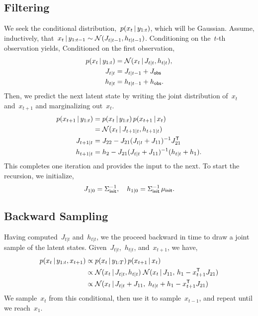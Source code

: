 \documentclass{article}
\begin{document}
\subsection*{Filtering}
We seek the conditional distribution,~$p(x_t \,|\, y_{1:t})$, which
will be Gaussian.  Assume, inductively,
that~$x_t \,|\, y_{1:t-1} \sim \mathcal{N}(J_{t|t-1},
h_{t|t-1})$.
Conditioning on the~$t$-th observation yields, Conditioned on the
first observation,
\begin{align}
  p(x_t \,|\, y_{1:t}) &= \mathcal{N}(x_t \,|\, J_{t|t}, h_{t|t}), \\
  J_{t|t} &= J_{t|t-1} + J_{\sf obs} \\
  h_{t|t} &= h_{t|t-1} + h_{\sf obs}.
\end{align}
Then, we predict the next latent state by writing the joint distribution of~$x_t$ and~$x_{t+1}$ and marginalizing out~$x_t$.
\begin{align}
  p(x_{t+1} \,|\, y_{1:t}) &= p(x_t \,|\, y_{1:t}) \, p(x_{t+1} \,|\, x_t) \\
  &= \mathcal{N}(x_t \,|\, J_{t+1|t}, h_{t+1|t}) \\
  J_{t+1|t} &= J_{22} - J_{21} (J_{t|t} + J_{11})^{-1}J_{21}^{\mathsf{T}} \\
  h_{t+1|t} &= h_2 - J_{21} (J_{t|t} + J_{11})^{-1} (h_{t|t} + h_1).
\end{align}
This completes one iteration and provides the input to the next. To start the recursion, we initialize,
\begin{align}
  J_{1|0} = \Sigma_{\sf init}^{-1}, \quad
  h_{1|0} = \Sigma_{\sf init}^{-1} \, \mu_{\sf init}.
\end{align}

\subsection*{Backward Sampling}
Having computed~$J_{t|t}$ and~$h_{t|t}$, we the proceed backward in time to draw a joint sample of the latent states. 
Given~$J_{t|t}$,~$h_{t|t}$, and~$x_{t+1}$, we have,
\begin{align}
  p(x_{t} \,|\, y_{1:t}, x_{t+1}) &\propto p(x_t \,|\, y_{1:T}) \, p(x_{t+1} \,|\, x_t) \\
  &\propto \mathcal{N}(x_t \,|\, J_{t|t}, h_{t|t})  \;
    \mathcal{N}(x_t \,|\, J_{11}, \, h_1 - x_{t+1}^{\mathsf{T}} J_{21} ) \\
  &\propto     \mathcal{N}(x_t \,|\, J_{t|t} + J_{11}, \; h_{t|t} + h_1 - x_{t+1}^{\mathsf{T}} J_{21} )
\end{align}
We sample~$x_t$ from this conditional, then use it to sample~$x_{t-1}$, and repeat until we reach~$x_1$.
\end{document}
